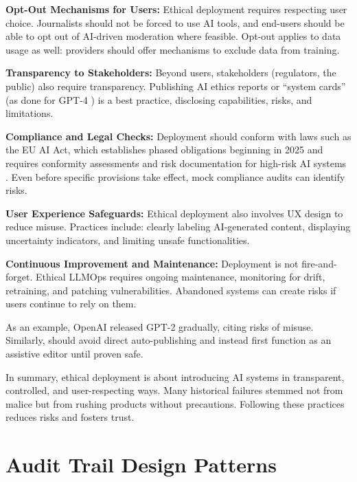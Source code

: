 \textbf{Opt-Out Mechanisms for Users:} Ethical deployment requires respecting user choice. Journalists should not be forced to use AI tools, and end-users should be able to opt out of AI-driven moderation where feasible. Opt-out applies to data usage as well: providers should offer mechanisms to exclude data from training.

\textbf{Transparency to Stakeholders:} Beyond users, stakeholders (regulators, the public) also require transparency. Publishing AI ethics reports or ``system cards'' (as done for GPT-4 \cite{nature2023}) is a best practice, disclosing capabilities, risks, and limitations.

\textbf{Compliance and Legal Checks:} Deployment should conform with laws such as the EU AI Act, which establishes phased obligations beginning in 2025 and requires conformity assessments and risk documentation for high-risk AI systems \cite{eu_ai_act_policy_page}. Even before specific provisions take effect, mock compliance audits can identify risks.

\textbf{User Experience Safeguards:} Ethical deployment also involves UX design to reduce misuse. Practices include: clearly labeling AI-generated content, displaying uncertainty indicators, and limiting unsafe functionalities.

\textbf{Continuous Improvement and Maintenance:} Deployment is not fire-and-forget. Ethical LLMOps requires ongoing maintenance, monitoring for drift, retraining, and patching vulnerabilities. Abandoned systems can create risks if users continue to rely on them.

As an example, OpenAI released GPT-2 gradually, citing risks of misuse. Similarly, \ishtar{} should avoid direct auto-publishing and instead first function as an assistive editor until proven safe.

In summary, ethical deployment is about introducing AI systems in transparent, controlled, and user-respecting ways. Many historical failures stemmed not from malice but from rushing products without precautions. Following these practices reduces risks and fosters trust.

\section{Audit Trail Design Patterns}\label{sec:ch11_audit_trail}

